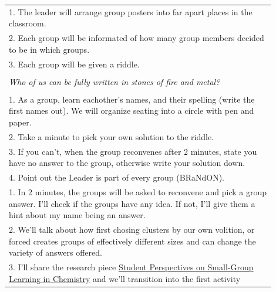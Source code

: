 \documentclass{article}
\begin{document}
\begin{tabular}{|p{0.9\linewidth}|}
\hline

\vspace{0.2cm}
1. The leader will arrange group posters into far apart places in the classroom. \\
2. Each group will be informated of how many group members decided to be in which groups. \\
3. Each group will be given a riddle. \\[0.5em]
\begin{centering}
    \emph{Split me clean and I become the table itself.} \\
    \emph{Who of us can be fully written in stones of fire and metal?} \\
\end{centering}
\\[0.5em]
1. As a group, learn eachother's names, and their spelling (write the first names out). We will organize seating into a circle with pen and paper. \\
2. Take a minute to pick your own solution to the riddle. \\
3. If you can't, when the group reconvenes after 2 minutes, state you have no answer to the group, otherwise write your solution down. \\
4. Point out the Leader is part of every group (BRaNdON). \\[0.5em]
1. In 2 minutes, the groups will be asked to reconvene and pick a group answer. I'll check if the groups have any idea. If not, I'll give them a hint about my name being an answer. \\
2. We'll talk about how first chosing clusters by our own volition, or forced creates groups of effectively different sizes and can change the variety of answers offered. \\
3. I'll share the research piece \href{https://pubs.acs.org/doi/pdf/10.1021/ed077p111?ref=article_openPDF}{Student Perspectives on Small-Group Learning in Chemistry} and we'll transition into the first activity
\hline
\end{tabular}
\newpage
\end{document}
